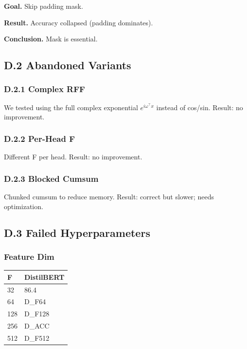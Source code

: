 \textbf{Goal.} Skip padding mask.

\textbf{Result.} Accuracy collapsed (padding dominates).

\textbf{Conclusion.} Mask is essential.

\subsection{D.2 Abandoned Variants}

\subsubsection{D.2.1 Complex RFF}

We tested using the full complex exponential $e^{i \omega^\top x}$ 
instead of cos/sin. Result: no improvement.

\subsubsection{D.2.2 Per-Head F}

Different F per head. Result: no improvement.

\subsubsection{D.2.3 Blocked Cumsum}

Chunked cumsum to reduce memory. Result: correct but slower; needs 
optimization.

\subsection{D.3 Failed Hyperparameters}

\subsubsection{Feature Dim}

\begin{table}[H]
\centering
\small
\begin{tabular}{ll}
\toprule
\textbf{F} & \textbf{DistilBERT} \\
\midrule
32 & 86.4 \\
64 & {{D\_F64}} \\
128 & {{D\_F128}} \\
256 & {{D\_ACC}} \\
512 & {{D\_F512}} \\
\bottomrule
\end{tabular}
\end{table}

